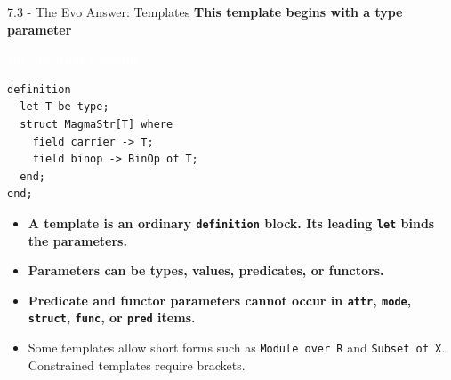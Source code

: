 \documentclass[aspectratio=169,11pt]{beamer}
\newcommand{\statusbadge}[2]{\colorbox{#1}{\textcolor{white}{\strut\scriptsize\sffamily\bfseries #2}}}
\newcommand{\badgeSpec}{\statusbadge{green!35!black}{specification example}}
\begin{document}
\begin{frame}[fragile,t]{7.3 - The Evo Answer: Templates}
\smallskip
\textbf{\textcolor{blue!55!black}{\textbf{This template begins with a type parameter}}}~\badgeSpec
\begin{lstlisting}[language={mizar},basicstyle=\ttfamily\small]
definition
  let T be type;
  struct MagmaStr[T] where
    field carrier -> T;
    field binop -> BinOp of T;
  end;
end;
\end{lstlisting}
\begin{itemize}
\setlength{\itemsep}{1pt}
\setlength{\parsep}{0pt}
\setlength{\parskip}{0pt}
\item \textcolor{blue!55!black}{\textbf{A template is an ordinary \texttt{definition} block. Its leading \texttt{let} binds the parameters.}}
\item \textcolor{blue!55!black}{\textbf{Parameters can be types, values, predicates, or functors.}}
\item \textcolor{blue!55!black}{\textbf{Predicate and functor parameters cannot occur in \texttt{attr}, \texttt{mode}, \texttt{struct}, \texttt{func}, or \texttt{pred} items.}}
\item Some templates allow short forms such as \texttt{Module over R} and \texttt{Subset of X}. Constrained templates require brackets.
\end{itemize}
\end{frame}
\end{document}
